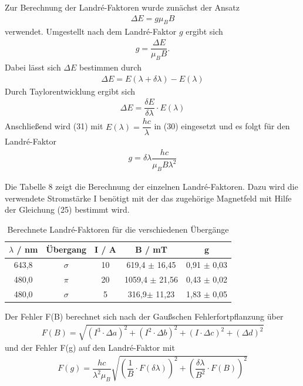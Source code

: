 \documentclass{article}
\begin{document}
Zur Berechnung der Landré-Faktoren wurde zunächst der Ansatz
\begin{align}
\Delta E= g \mu_BB
\end{align}
verwendet.
Umgestellt nach dem Landré-Faktor $g$ ergibt sich
\begin{align}
g=\dfrac{\Delta E}{\mu_B B}.
\end{align}
Dabei lässt sich $\Delta E$ bestimmen durch
\begin{align*}
\Delta E=E(\lambda + \delta \lambda)-E(\lambda)
\end{align*}
Durch Taylorentwicklung ergibt sich 
\begin{align}
\Delta E=\dfrac{\delta E}{\delta \lambda}\cdot E(\lambda)
\end{align}
Anschließend wird (31) mit $E(\lambda)=\dfrac{hc}{\lambda}$ in (30) eingesetzt und es folgt für den Landré-Faktor
\begin{align}
g=\delta\lambda\dfrac{hc}{\mu_B B\lambda^2}
\end{align}


Die Tabelle 8 zeigt die Berechnung der einzelnen Landré-Faktoren. Dazu wird die verwendete Stromstärke I benötigt mit der das zugehörige Magnetfeld mit Hilfe der Gleichung (25) bestimmt wird. 

\begin{table} [H]
	\centering
	\caption{ Berechnete Landré-Faktoren für die verschiedenen Übergänge}
	
	\label {tab:threecols}
	\begin{tabular}{c|c|c|c|c} \hline		
		$\lambda$ / nm & Übergang & I / A & B / mT &  g\\ 
		\hline 
	643,8& $\sigma$& 10&619,4 $\pm$ 16,45 &0,91 $\pm$ 0,03 \\
	480,0&$\pi$&20&1059,4 $\pm$ 21,56&0,43 $\pm$ 0,02\\
	480,0& $\sigma$&5&316,9$\pm$ 11,23&1,83 $\pm$ 0,05\\
		
		
		\hline
	\end{tabular} 	
	
	\label {tab:threecols}
\end{table}
Der Fehler F(B) berechnet sich nach der Gaußschen Fehlerfortpflanzung über 
\begin{align}
F(B)=\sqrt{(I^3\cdot \Delta a)^2+(I^2\cdot \Delta b)^2+(I\cdot\Delta c)^2+(\Delta d)^2}
\end{align}
und der Fehler F(g) auf den Landré-Faktor mit
\begin{align*}
F(g)= \dfrac{hc}{\lambda^2 \mu_B}\sqrt{\left(\dfrac{1}{B}\cdot F(\delta\lambda)\right)^2+\left(\dfrac{\delta\lambda}{B^2}\cdot F(B)\right)^2}
\end{align*}
\end{document}
